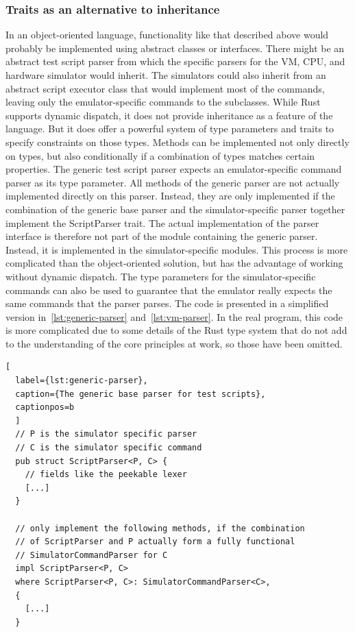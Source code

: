 \subsubsection{Traits as an alternative to inheritance}
In an object-oriented language, functionality like that described above would probably be implemented using abstract classes or interfaces. There might be an abstract test script parser from which the specific parsers for the VM, CPU, and hardware simulator would inherit.
The simulators could also inherit from an abstract script executor class that would implement most of the commands, leaving only the emulator-specific commands to the subclasses.
While Rust supports dynamic dispatch, it does not provide inheritance as a feature of the language.
But it does offer a powerful system of type parameters and traits to specify constraints on those types.
Methods can be implemented not only directly on types, but also conditionally if a combination of types matches certain properties.
The generic test script parser expects an emulator-specific command parser as its type parameter.
All methods of the generic parser are not actually implemented directly on this parser. Instead, they are only implemented if the combination of the generic base parser and the simulator-specific parser together implement the ScriptParser trait.
The actual implementation of the parser interface is therefore not part of the module containing the generic parser. Instead, it is implemented in the simulator-specific modules.
This process is more complicated than the object-oriented solution, but has the advantage of working without dynamic dispatch. The type parameters for the simulator-specific commands can also be used to guarantee that the emulator really expects the same commands that the parser parses.
The code is presented in a simplified version in~\cref{lst:generic-parser} and~\cref{lst:vm-parser}.
In the real program, this code is more complicated due to some details of the Rust type system that do not add to the understanding of the core principles at work, so those have been omitted.

\begin{lstlisting}[
  label={lst:generic-parser},
  caption={The generic base parser for test scripts},
  captionpos=b
  ]
  // P is the simulator specific parser
  // C is the simulator specific command
  pub struct ScriptParser<P, C> {
    // fields like the peekable lexer
    [...]
  }

  // only implement the following methods, if the combination
  // of ScriptParser and P actually form a fully functional
  // SimulatorCommandParser for C
  impl ScriptParser<P, C>
  where ScriptParser<P, C>: SimulatorCommandParser<C>,
  {
    [...]
  }
\end{lstlisting}

